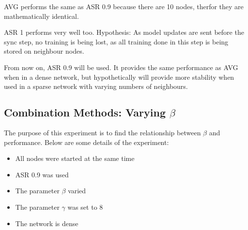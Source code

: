 AVG performs the same as ASR 0.9 because there are 10 nodes, therfor they are mathematically identical.

ASR 1 performs very well too. Hypothesis: As model updates are sent before the sync step, no training is being lost, as all training done in this step is being stored on neighbour nodes.

From now on, ASR 0.9 will be used. It provides the same performance as AVG when in a dense network, but hypothetically will provide more stability when used in a sparse network with varying numbers of neighbours.

\subsection{Combination Methods: Varying $\beta$}
The purpose of this experiment is to find the relationship between $\beta$ and performance. Below are some details of the experiment:

\begin{itemize}
	\item All nodes were started at the same time
	\item ASR 0.9 was used
	\item The parameter $\beta$ varied
	\item The parameter $\gamma$ was set to 8
	\item The network is dense
\end{itemize}